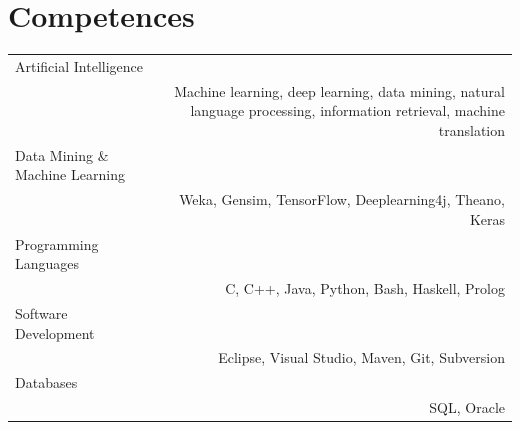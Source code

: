\documentclass[10pt]{article}
\begin{document}
\section*{Competences}
\begin{tabular}{L!{\VRule}R}
Artificial Intelligence\\&Machine learning, deep learning, data mining, natural language processing, information retrieval, machine translation\\
Data Mining \& Machine Learning\\&Weka, Gensim, TensorFlow, Deeplearning4j, Theano, Keras\\
Programming Languages\\&C, C++, Java, Python, Bash, Haskell, Prolog\\
Software Development\\&Eclipse, Visual Studio, Maven, Git, Subversion\\
Databases\\&SQL, Oracle\\
\end{tabular}
\end{document}
